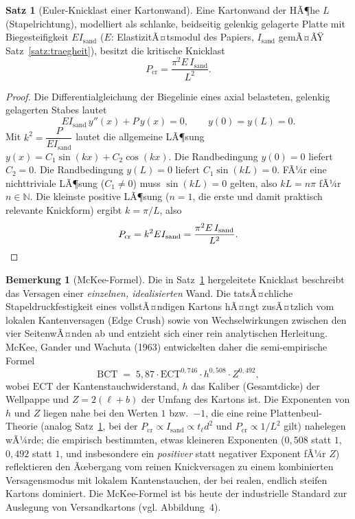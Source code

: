 ﻿\documentclass[a4paper,12pt]{article}
\theoremstyle{definition}
\newtheorem{satz}{Satz}
\newtheorem{bemerkung}{Bemerkung}
\begin{document}
\begin{satz}[Euler-Knicklast einer Kartonwand]
	\label{satz:euler}
	Eine Kartonwand der HÃ¶he $L$ (Stapelrichtung), modelliert als schlanke,
	beidseitig gelenkig gelagerte Platte mit Biegesteifigkeit $E I_{\mathrm{sand}}$
	($E$: ElastizitÃ¤tsmodul des Papiers, $I_{\mathrm{sand}}$ gemÃ¤ÃŸ
	Satz~\ref{satz:traegheit}), besitzt die kritische Knicklast
	\[
		P_{\mathrm{cr}} = \frac{\pi^2 E\,I_{\mathrm{sand}}}{L^2}.
	\]
\end{satz}

\begin{proof}
	Die Differentialgleichung der Biegelinie eines axial belasteten,
	gelenkig gelagerten Stabes lautet
	\[
		E I_{\mathrm{sand}}\,y''(x) + P\,y(x) = 0, \qquad y(0) = y(L) = 0.
	\]
	Mit $k^2 = \dfrac{P}{E I_{\mathrm{sand}}}$ lautet die allgemeine LÃ¶sung
	$y(x) = C_1 \sin(kx) + C_2\cos(kx)$. Die Randbedingung $y(0)=0$ liefert
	$C_2 = 0$. Die Randbedingung $y(L)=0$ liefert $C_1 \sin(kL) = 0$. FÃ¼r eine
	nichttriviale LÃ¶sung ($C_1 \neq 0$) muss $\sin(kL) = 0$ gelten, also
	$kL = n\pi$ fÃ¼r $n \in \mathbb{N}$. Die kleinste positive LÃ¶sung ($n=1$,
	die erste und damit praktisch relevante Knickform) ergibt $k = \pi/L$,
	also
	\[
		P_{\mathrm{cr}} = k^2 E I_{\mathrm{sand}} = \frac{\pi^2 E\,I_{\mathrm{sand}}}{L^2}. \qedhere
	\]
\end{proof}

\begin{bemerkung}[McKee-Formel]
	\label{bem:mckee}
	Die in Satz~\ref{satz:euler} hergeleitete Knicklast beschreibt das
	Versagen einer \emph{einzelnen, idealisierten} Wand. Die tatsÃ¤chliche
	Stapeldruckfestigkeit eines vollstÃ¤ndigen Kartons hÃ¤ngt zusÃ¤tzlich vom
	lokalen Kantenversagen (Edge Crush) sowie von Wechselwirkungen zwischen
	den vier SeitenwÃ¤nden ab und entzieht sich einer rein analytischen
	Herleitung. McKee, Gander und Wachuta (1963) entwickelten daher die
	semi-empirische Formel
	\[
		\mathrm{BCT} \;=\; 5{,}87 \cdot \mathrm{ECT}^{0{,}746}
		\cdot h^{0{,}508} \cdot Z^{0{,}492},
	\]
	wobei $\mathrm{ECT}$ der Kantenstauchwiderstand, $h$ das Kaliber
	(Gesamtdicke) der Wellpappe und $Z = 2(\ell+b)$ der Umfang des Kartons ist.
	Die Exponenten von $h$ und $Z$ liegen nahe bei den Werten $1$ bzw.\ $-1$,
	die eine reine Plattenbeul-Theorie (analog Satz~\ref{satz:euler}, bei der
	$P_{\mathrm{cr}} \propto I_{\mathrm{sand}} \propto t_\ell d^2$ und
	$P_{\mathrm{cr}} \propto 1/L^2$ gilt) nahelegen wÃ¼rde; die empirisch
	bestimmten, etwas kleineren Exponenten ($0{,}508$ statt $1$, $0{,}492$
	statt $1$, und insbesondere ein \emph{positiver} statt negativer Exponent
	fÃ¼r $Z$) reflektieren den Ãœbergang vom reinen Knickversagen zu einem
	kombinierten Versagensmodus mit lokalem Kantenstauchen, der bei realen,
	endlich steifen Kartons dominiert. Die McKee-Formel ist bis heute der
	industrielle Standard zur Auslegung von Versandkartons (vgl.
	Abbildung~4).
\end{bemerkung}
\end{document}
